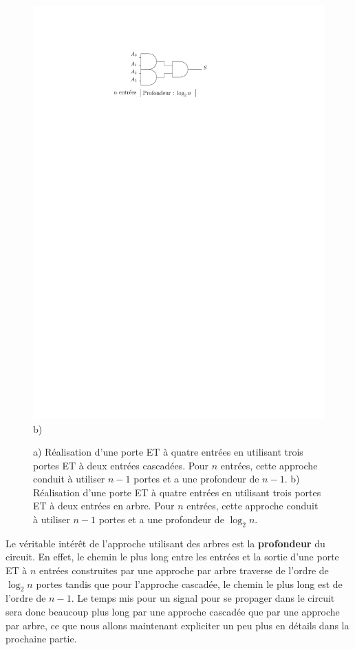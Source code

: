 \begin{figure}[htbp]
\begin{minipage}[c]{.36\linewidth}
\includegraphics[width=\columnwidth]{Figs/and_4e_arbre.pdf} \\\centering b)
   \end{minipage}
\caption{\label{fig:and_4e} a) Réalisation d'une porte ET à quatre entrées en utilisant trois portes ET à deux entrées cascadées. Pour $n$ entrées, cette approche conduit à utiliser $n-1$ portes et a une profondeur de $n-1$. b) Réalisation d'une porte ET à quatre entrées en utilisant trois portes ET à deux entrées en arbre. Pour $n$ entrées, cette approche conduit à utiliser $n-1$ portes et a une profondeur de $\log_2 n$.}
\end{figure}

Le véritable intérêt de l'approche utilisant des arbres est la \textbf{profondeur} du circuit. En effet, le chemin le plus long entre les entrées et la sortie d'une porte ET à $n$ entrées construites par une approche par arbre traverse de l'ordre de $\log_2 n$ portes tandis que pour l'approche cascadée, le chemin le plus long est de l'ordre de $n-1$. Le temps mis pour un signal pour se propager dans le circuit sera donc beaucoup plus long par une approche cascadée que par une approche par arbre, ce que nous allons maintenant expliciter un peu plus en détails dans la prochaine partie.

